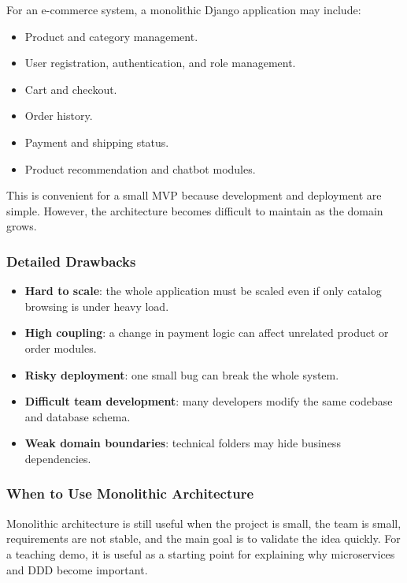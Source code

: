 \documentclass[12pt,a4paper]{article}
\begin{document}
For an e-commerce system, a monolithic Django application may include:

\begin{itemize}
    \item Product and category management.
    \item User registration, authentication, and role management.
    \item Cart and checkout.
    \item Order history.
    \item Payment and shipping status.
    \item Product recommendation and chatbot modules.
\end{itemize}

This is convenient for a small MVP because development and deployment are simple. However, the architecture becomes difficult to maintain as the domain grows.

\subsubsection{Detailed Drawbacks}

\begin{itemize}
    \item \textbf{Hard to scale}: the whole application must be scaled even if only catalog browsing is under heavy load.
    \item \textbf{High coupling}: a change in payment logic can affect unrelated product or order modules.
    \item \textbf{Risky deployment}: one small bug can break the whole system.
    \item \textbf{Difficult team development}: many developers modify the same codebase and database schema.
    \item \textbf{Weak domain boundaries}: technical folders may hide business dependencies.
\end{itemize}

\subsubsection{When to Use Monolithic Architecture}

Monolithic architecture is still useful when the project is small, the team is small, requirements are not stable, and the main goal is to validate the idea quickly. For a teaching demo, it is useful as a starting point for explaining why microservices and DDD become important.
\end{document}
